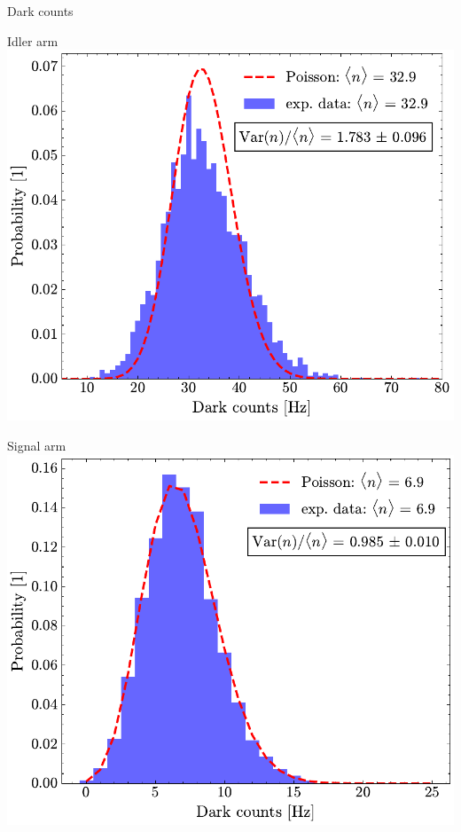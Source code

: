 \documentclass[10pt,aspectratio=43]{beamer}
\begin{document}
	\begin{frame}{Dark counts}
		\begin{minipage}{.45\textwidth}
			\centering
			Idler arm
			\vspace{2em}
			\includegraphics[width=\textwidth]{Images/DC_Idl_2.pdf}
		\end{minipage}
		\hfill
		\begin{minipage}{.45\textwidth}
			\centering
			Signal arm
			\vspace{2em}
			\includegraphics[width=\textwidth]{Images/DC_Sig_2.pdf}
		\end{minipage}
	\end{frame}
	
\end{document}
